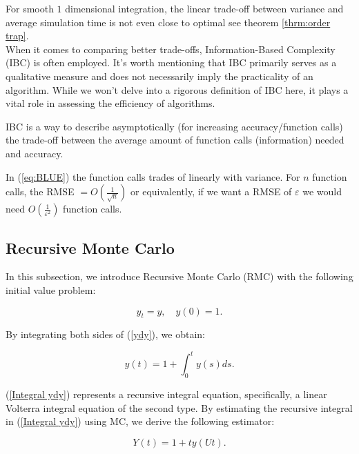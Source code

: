 \documentclass[a4paper,12pt]{article}
\begin{document}
For smooth $1$ dimensional integration, the linear trade-off between
variance and average simulation time is not even close to optimal see
theorem \ref{thrm:order trap}. \\
When it comes to comparing better trade-offs,
Information-Based Complexity (IBC) is often employed.
It's worth mentioning that IBC primarily serves as a
qualitative measure and does not necessarily imply the
practicality of an algorithm. While we won't delve into a
rigorous definition of IBC here, it plays a vital role in
assessing the efficiency of algorithms.

\begin{definition}
    IBC is a way to describe asymptotically (for increasing accuracy/function calls)
    the trade-off between the average amount of function calls (information)
    needed and accuracy.
\end{definition}

\begin{example}
    In (\ref{eq:BLUE}) the function calls trades of
    linearly with variance. For $n$ function calls,
    the RMSE $= O\left(\frac{1}{\sqrt{n}}\right)$ or equivalently, if we want a
    RMSE of $\varepsilon$ we would need $O\left(\frac{1}{\varepsilon^{2}}\right)$
    function calls.
\end{example}


\subsection{Recursive Monte Carlo}
In this subsection, we introduce Recursive Monte Carlo (RMC)
with the following  initial value problem:


\begin{equation} \label{ydy}
    y_t = y, \quad y(0) = 1.
\end{equation}


By integrating both sides of (\ref{ydy}), we obtain:

\begin{equation} \label{Integral ydy}
    y(t) = 1 + \int_{0}^{t} y(s) ds.
\end{equation}

(\ref{Integral ydy}) represents a recursive integral equation,
specifically, a linear Volterra integral equation of the second type.
By estimating the recursive integral in (\ref{Integral ydy})
using MC, we derive the following estimator:

\begin{equation}
    Y(t) = 1 + t  y(Ut).
\end{equation}
\end{document}
